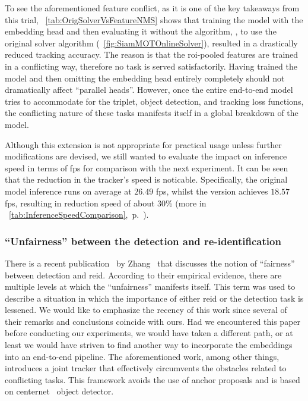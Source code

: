 To see the aforementioned feature conflict, as it is one of the key takeaways from this trial, \tabletext{}~\ref{tab:OrigSolverVsFeatureNMS} shows that training the model with the embedding head and then evaluating it without the \featurenms{} algorithm, \ietext{}, to use the original solver algorithm (\figtext{}~\ref{fig:SiamMOTOnlineSolver}), resulted in a drastically reduced tracking accuracy. The reason is that the \gls{roi}-pooled features are trained in a conflicting way, therefore no task is served satisfactorily. Having trained the model and then omitting the embedding head entirely completely should not dramatically affect ``parallel heads''. However, once the entire end-to-end model tries to accommodate for the triplet, object detection, and tracking loss functions, the conflicting nature of these tasks manifests itself in a global breakdown of the model.

Although this extension is not appropriate for practical usage unless further modifications are devised, we still wanted to evaluate the impact on inference speed in terms of \gls{fps} for comparison with the next experiment. It can be seen that the reduction in the tracker's speed is noticable. Specifically, the original model inference runs on average at $26.49$ \gls{fps}, whilst the \fembmodel{} version achieves $18.57$ \gls{fps}, resulting in reduction speed of about $30$\% (more in \tabletext{}~\ref{tab:InferenceSpeedComparison},~p.~\pageref{tab:InferenceSpeedComparison}).

\subsubsection{``Unfairness'' between the detection and re-identification}

There is a recent publication~\cite{zhang2021fairmot} by Zhang~\etal{} that discusses the notion of ``fairness'' between detection and \gls{reid}. According to their empirical evidence, there are multiple levels at which the ``unfairness'' manifests itself. This term was used to describe a situation in which the importance of either \gls{reid} or the detection task is lessened. We would like to emphasize the recency of this work since several of their remarks and conclusions coincide with ours. Had we encountered this paper before conducting our experiments, we would have taken a different path, or at least we would have striven to find another way to incorporate the embeddings into an end-to-end pipeline. The aforementioned work, among other things, introduces a joint tracker that effectively circumvents the obstacles related to conflicting tasks. This framework avoids the use of anchor proposals and is based on \gls{centernet}~\cite{zhou2019centernet} object detector.

